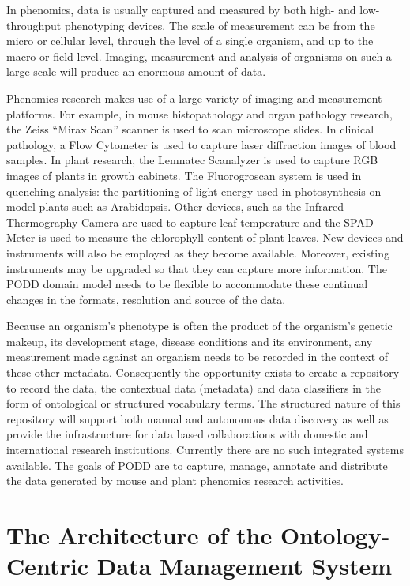 \documentclass{llncs}
\begin{document}
In phenomics, data is usually captured and measured by both high- and
low-throughput phenotyping devices. The scale of measurement can be
from the micro or cellular level, through the level of a single
organism, and up to the macro or field level. Imaging, measurement and
analysis of organisms on such a large scale will produce an enormous
amount of data.

Phenomics research makes use of a large variety of imaging and
measurement platforms. For example, in mouse histopathology and organ
pathology research, the Zeiss ``Mirax Scan'' scanner is used to scan
microscope slides. In clinical pathology, a Flow Cytometer is used to
capture laser diffraction images of blood samples. In plant research,
the Lemnatec Scanalyzer is used to capture RGB images of plants in
growth cabinets. The Fluorogroscan system is used in quenching
analysis: the partitioning of light energy used in photosynthesis on
model plants such as Arabidopsis. Other devices, such as the Infrared
Thermography Camera are used to capture leaf temperature and the SPAD
Meter is used to measure the chlorophyll content of plant leaves. New
devices and instruments will also be employed as they become available.
Moreover, existing instruments may be upgraded so that they can capture
more information. The PODD domain model needs to be flexible to
accommodate these continual changes in the formats, resolution and
source of the data.

Because an organism's phenotype is often the product of the organism's
genetic makeup, its development stage, disease conditions and its
environment, any measurement made against an organism needs to be
recorded in the context of these other metadata. Consequently the
opportunity exists to create a repository to record the data, the
contextual data (metadata) and data classifiers in the form of
ontological or structured vocabulary terms. The structured nature of
this repository will support both manual and autonomous data discovery
as well as provide the infrastructure for data based collaborations
with domestic and international research institutions. Currently there
are no such integrated systems available. The goals of PODD are to
capture, manage, annotate and distribute the data generated by mouse
and plant phenomics research activities.


\section{The Architecture of the Ontology-Centric Data Management
System}\label{sec:arch}
\end{document}

